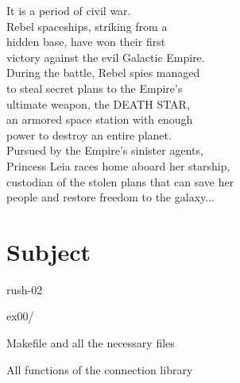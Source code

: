 \documentclass[12pt]{article}
\begin{document}
\begin{flushleft}
    It is a period of civil war.\\
    Rebel spaceships, striking from a\\
    hidden base, have won their first\\
    victory against the evil Galactic Empire.\\[1em]

    During the battle, Rebel spies managed\\
    to steal secret plans to the Empire's\\
    ultimate weapon, the DEATH STAR,\\
    an armored space station with enough\\
    power to destroy an entire planet.\\[1em]

    Pursued by the Empire's sinister agents,\\
    Princess Leia races home aboard her starship,\\
    custodian of the stolen plans that can save her\\
    people and restore freedom to the galaxy...
    \end{flushleft}

\newpage

\section{Subject}

\begin{description}[labelwidth=3cm, leftmargin=!]
  \item[Exercise 00:] rush-02
  \item[Turn-in directory:] ex00/
  \item[Files to turn in:] Makefile and all the necessary files
  \item[Allowed functions:] All functions of the connection library
\end{description}
\end{document}
